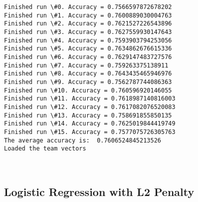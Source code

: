 \documentclass[11pt]{article}
\begin{document}
    \begin{Verbatim}[commandchars=\\\{\}]
Finished run \#0. Accuracy = 0.7566597872678202
Finished run \#1. Accuracy = 0.7600889030004763
Finished run \#2. Accuracy = 0.7621527226543896
Finished run \#3. Accuracy = 0.7627559930147643
Finished run \#4. Accuracy = 0.7593903794253056
Finished run \#5. Accuracy = 0.7634862676615336
Finished run \#6. Accuracy = 0.7629147483727576
Finished run \#7. Accuracy = 0.759263375138911
Finished run \#8. Accuracy = 0.7643435465946976
Finished run \#9. Accuracy = 0.7562787744086363
Finished run \#10. Accuracy = 0.760596920146055
Finished run \#11. Accuracy = 0.7618987140816003
Finished run \#12. Accuracy = 0.7617082076520083
Finished run \#13. Accuracy = 0.758691855850135
Finished run \#14. Accuracy = 0.7625019844419749
Finished run \#15. Accuracy = 0.7577075726305763
The average accuracy is:  0.7606524845213526
Loaded the team vectors

    \end{Verbatim}

    \begin{center}
    \end{center}
    { \hspace*{\fill} \\}
    
    \hypertarget{logistic-regression-with-l2-penalty}{%
\subsection{Logistic Regression with L2
Penalty}\label{logistic-regression-with-l2-penalty}}
\end{document}
